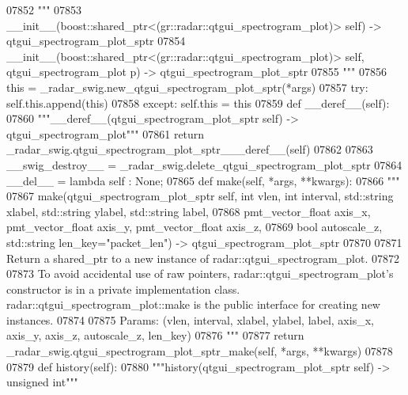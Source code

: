 \begin{DoxyCode}
{{{{{{{{{{{{{{{{{{{{{{{{{{07852         \textcolor{stringliteral}{"""}
07853 \textcolor{stringliteral}{        \_\_init\_\_(boost::shared\_ptr<(gr::radar::qtgui\_spectrogram\_plot)> self) ->
       qtgui\_spectrogram\_plot\_sptr}
07854 \textcolor{stringliteral}{        \_\_init\_\_(boost::shared\_ptr<(gr::radar::qtgui\_spectrogram\_plot)> self, qtgui\_spectrogram\_plot p) ->
       qtgui\_spectrogram\_plot\_sptr}
07855 \textcolor{stringliteral}{        """}
07856         this = \_radar\_swig.new\_qtgui\_spectrogram\_plot\_sptr(*args)
07857         \textcolor{keywordflow}{try}: self.this.append(this)
07858         \textcolor{keywordflow}{except}: self.this = this
07859     \textcolor{keyword}{def }__deref__(self):
07860         \textcolor{stringliteral}{"""\_\_deref\_\_(qtgui\_spectrogram\_plot\_sptr self) -> qtgui\_spectrogram\_plot"""}
07861         \textcolor{keywordflow}{return} \_radar\_swig.qtgui\_spectrogram\_plot\_sptr\_\_\_deref\_\_(self)
07862 
07863     \_\_swig\_destroy\_\_ = \_radar\_swig.delete\_qtgui\_spectrogram\_plot\_sptr
07864     \_\_del\_\_ = \textcolor{keyword}{lambda} self : \textcolor{keywordtype}{None};
07865     \textcolor{keyword}{def }make(self, *args, **kwargs):
07866         \textcolor{stringliteral}{"""}
07867 \textcolor{stringliteral}{        make(qtgui\_spectrogram\_plot\_sptr self, int vlen, int interval, std::string xlabel, std::string
       ylabel, std::string label, }
07868 \textcolor{stringliteral}{            pmt\_vector\_float axis\_x, pmt\_vector\_float axis\_y, pmt\_vector\_float axis\_z, }
07869 \textcolor{stringliteral}{            bool autoscale\_z, std::string len\_key="packet\_len") -> qtgui\_spectrogram\_plot\_sptr}
07870 \textcolor{stringliteral}{}
07871 \textcolor{stringliteral}{        Return a shared\_ptr to a new instance of radar::qtgui\_spectrogram\_plot.}
07872 \textcolor{stringliteral}{}
07873 \textcolor{stringliteral}{        To avoid accidental use of raw pointers, radar::qtgui\_spectrogram\_plot's constructor is in a
       private implementation class. radar::qtgui\_spectrogram\_plot::make is the public interface for creating new
       instances.}
07874 \textcolor{stringliteral}{}
07875 \textcolor{stringliteral}{        Params: (vlen, interval, xlabel, ylabel, label, axis\_x, axis\_y, axis\_z, autoscale\_z, len\_key)}
07876 \textcolor{stringliteral}{        """}
07877         \textcolor{keywordflow}{return} \_radar\_swig.qtgui\_spectrogram\_plot\_sptr\_make(self, *args, **kwargs)
07878 
07879     \textcolor{keyword}{def }history(self):
07880         \textcolor{stringliteral}{"""history(qtgui\_spectrogram\_plot\_sptr self) -> unsigned int"""}
}}}}}}}}}}}}}}}}}}}}}}}}}}
\end{DoxyCode}
